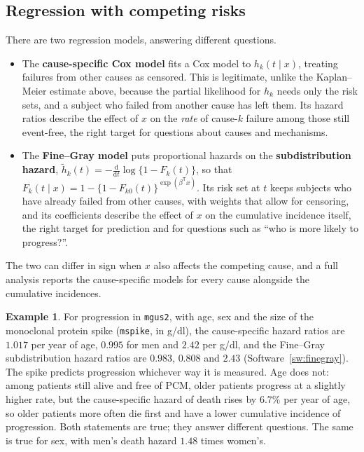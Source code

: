 \documentclass[11pt,a4paper]{article}
\numberwithin{equation}{section}
\theoremstyle{definition}
\newtheorem{exa}[thm]{Example}
\begin{document}
\subsection{Regression with competing risks}
\label{ssec:crregression}

There are two regression models, answering different questions.
\begin{itemize}
\item The \textbf{cause-specific Cox model} fits a Cox model to $h_k(t \mid x)$, treating failures from other causes as censored. This is legitimate, unlike the Kaplan--Meier estimate above, because the partial likelihood for $h_k$ needs only the risk sets, and a subject who failed from another cause has left them. Its hazard ratios describe the effect of $x$ on the \emph{rate} of cause-$k$ failure among those still event-free, the right target for questions about causes and mechanisms.
\item The \textbf{Fine--Gray model} puts proportional hazards on the \textbf{subdistribution hazard}, $\tilde h_k(t) = -\frac{\mathrm d}{\mathrm dt}\log\{1 - F_k(t)\}$, so that $F_k(t \mid x) = 1 - \{1 - F_{k0}(t)\}^{\exp(\beta^{\mathsf T}x)}$. Its risk set at $t$ keeps subjects who have already failed from other causes, with weights that allow for censoring, and its coefficients describe the effect of $x$ on the cumulative incidence itself, the right target for prediction and for questions such as ``who is more likely to progress?''.
\end{itemize}
The two can differ in sign when $x$ also affects the competing cause, and a full analysis reports the cause-specific models for every cause alongside the cumulative incidences.

\begin{exa}
\label{ex:mgusreg}
For progression in \texttt{mgus2}, with age, sex and the size of the monoclonal protein spike (\texttt{mspike}, in g/dl), the cause-specific hazard ratios are $1.017$ per year of age, $0.995$ for men and $2.42$ per g/dl, and the Fine--Gray subdistribution hazard ratios are $0.983$, $0.808$ and $2.43$ (Software~\ref{sw:finegray}). The spike predicts progression whichever way it is measured. Age does not: among patients still alive and
free of PCM, older patients progress at a slightly higher rate, but the cause-specific hazard of death rises by $6.7\%$ per year of age, so older patients more often die first and have a lower cumulative incidence of progression. Both statements are true; they answer different questions. The same is true for sex, with men's death hazard $1.48$ times women's.
\end{exa}
\end{document}
